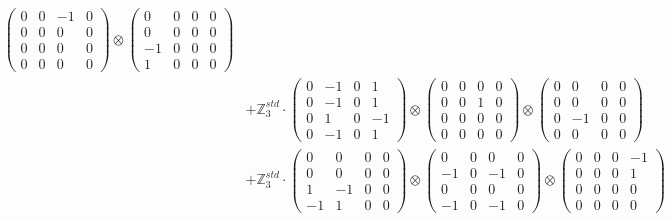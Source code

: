 \documentclass{article}
\begin{document}
{\begin{align}
            \begin{pmatrix} 0 & 0 & -1 & 0 \\ 0 & 0 & 0 & 0 \\ 0 & 0 & 0 & 0 \\ 0 & 0 & 0 & 0 \end{pmatrix} \otimes 
            \begin{pmatrix} 0 & 0 & 0 & 0 \\ 0 & 0 & 0 & 0 \\ -1 & 0 & 0 & 0 \\ 1 & 0 & 0 & 0 \end{pmatrix} \\ 
        &+ \label{Rs16-Rc11-Solution-27-c20} \mathbb{Z}_3^{std} \cdot 
            \begin{pmatrix} 0 & -1 & 0 & 1 \\ 0 & -1 & 0 & 1 \\ 0 & 1 & 0 & -1 \\ 0 & -1 & 0 & 1 \end{pmatrix} \otimes 
            \begin{pmatrix} 0 & 0 & 0 & 0 \\ 0 & 0 & 1 & 0 \\ 0 & 0 & 0 & 0 \\ 0 & 0 & 0 & 0 \end{pmatrix} \otimes 
            \begin{pmatrix} 0 & 0 & 0 & 0 \\ 0 & 0 & 0 & 0 \\ 0 & -1 & 0 & 0 \\ 0 & 0 & 0 & 0 \end{pmatrix} \\ 
        &+ \label{Rs16-Rc11-Solution-27-c21} \mathbb{Z}_3^{std} \cdot 
            \begin{pmatrix} 0 & 0 & 0 & 0 \\ 0 & 0 & 0 & 0 \\ 1 & -1 & 0 & 0 \\ -1 & 1 & 0 & 0 \end{pmatrix} \otimes 
            \begin{pmatrix} 0 & 0 & 0 & 0 \\ -1 & 0 & -1 & 0 \\ 0 & 0 & 0 & 0 \\ -1 & 0 & -1 & 0 \end{pmatrix} \otimes 
            \begin{pmatrix} 0 & 0 & 0 & -1 \\ 0 & 0 & 0 & 1 \\ 0 & 0 & 0 & 0 \\ 0 & 0 & 0 & 0 \end{pmatrix} \\ 

\end{align}}
\end{document}
